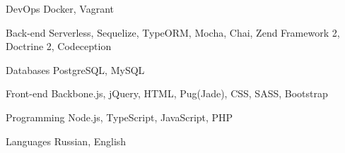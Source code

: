

\begin{cvskills}

  \cvskill
    {DevOps} %
    {Docker, Vagrant} %

  \cvskill
    {Back-end} %
    {Serverless, Sequelize, TypeORM, Mocha, Chai, Zend Framework 2, Doctrine 2, Codeception} %

  \cvskill
    {Databases} %
    {PostgreSQL, MySQL} %

  \cvskill
    {Front-end} %
    {Backbone.js, jQuery, HTML, Pug(Jade), CSS, SASS, Bootstrap} %

  \cvskill
    {Programming} %
    {Node.js, TypeScript, JavaScript, PHP} %

  \cvskill
    {Languages} %
    {Russian, English} %

\end{cvskills}
